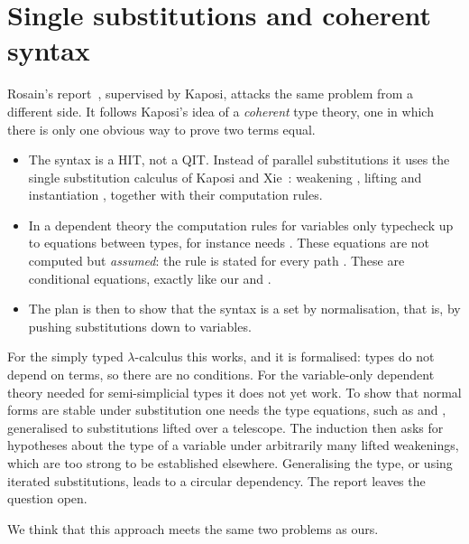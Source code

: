 \documentclass[11pt]{article}
\newcommand{\ag}[1]{\texttt{\detokenize{#1}}}
\begin{document}
\section{Single substitutions and coherent syntax}\label{sec:ssc}

Rosain's report~\cite{rosain}, supervised by Kaposi, attacks the same problem
from a different side. It follows Kaposi's idea of a \emph{coherent} type
theory, one in which there is only one obvious way to prove two terms equal.
\begin{itemize}
\item The syntax is a HIT, not a QIT. Instead of parallel substitutions it uses
  the single substitution calculus of Kaposi and Xie~\cite{kaposi-xie}:
  weakening \ag{p}, lifting \ag{γ⁺} and instantiation \ag{⟨x⟩}, together with
  their computation rules.
\item In a dependent theory the computation rules for variables only typecheck
  up to equations between types, for instance
  \ag{vz[γ⁺] = vz} needs \ag{A[p][γ⁺] = A[γ][p]}. These equations are not
  computed but \emph{assumed}: the rule is stated for every path
  \ag{e : A[p][γ⁺] ≡ A[γ][p]}. These are conditional equations, exactly like
  our \ag{t-k∘t-k} and \ag{wkext}.
\item The plan is then to show that the syntax is a set by normalisation, that
  is, by pushing substitutions down to variables.
\end{itemize}
For the simply typed $\lambda$-calculus this works, and it is formalised:
types do not depend on terms, so there are no conditions. For the
variable-only dependent theory needed for semi-simplicial types it does not
yet work. To show that normal forms are stable under substitution one needs
the type equations, such as \ag{A[p][⟨y⟩] = A} and
\ag{A[p][γ⁺] = A[γ][p]}, generalised to substitutions lifted over a telescope.
The induction then asks for hypotheses about the type of a variable under
arbitrarily many lifted weakenings, which are too strong to be established
elsewhere. Generalising the type, or using iterated substitutions, leads to a
circular dependency. The report leaves the question open.

We think that this approach meets the same two problems as ours.
\end{document}
